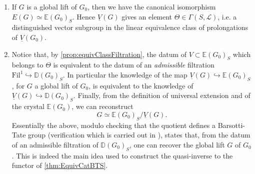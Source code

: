 \begin{rem}[]
\begin{enumerate}
	\item If $G$ is a global lift of $G_0$, then we have the canonical isomorphism
		$E(G) \simeq \mathbb{E}(G_0)_S$.
		Hence $\underline{V}(G)$ gives an element $\Theta \in \Gamma(S,\mathscr{L})$,
		i.e. a distinguished vector subgroup in the linear equivalence
		class of prolongations of $\underline{V}(G_0)$.

	\item Notice that, by \cref{prop:equivClassFiltration}, the datum of 
		$V \subset \mathbb{E}(G_0)_S$ which belongs to $\Theta$ is
		equivalent to the datum of an {\em admissible} filtration
		$\mathrm{Fil}^1 \hookrightarrow \mathbb{D}(G_0)_S$.
		In particular the knowledge of the map
		$\underline{V}(G) \hookrightarrow \mathbb{E}(G_0)_S$, for $G$ a global
		lift of $G_0$, is equivalent to the knowledge of
		$\underline{V}(G) \hookrightarrow \mathbb{D}(G_0)_S$.
		Finally, from the definition of universal extension
		and of the crystal $\mathbb{E}(G_0)$, we can reconstruct 
		\begin{equation*}
			G \simeq \mathbb{E}(G_0)_S/\underline{V}(G)
		.\end{equation*}
		Essentially the above, modulo checking that the quotient defines
		a Barsotti-Tate group (verification which is carried out in
		\cite[Chapter V, theorem 1.6]{Messing}), states that, from 
		the datum of an admissible filtration of $\mathbb{D}(G_0)_S$,
		one can recover the global lift $G$ of $G_0$.
		This is indeed the main idea used to construct the quasi-inverse
		to the functor of \cref{thm:EquivCatBTS}.
\end{enumerate}
\end{rem}

